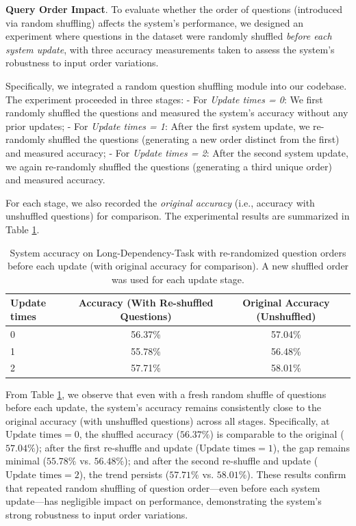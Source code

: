 \textbf{Query Order Impact}. To evaluate whether the order of questions (introduced via random shuffling) affects the system's performance, we designed an experiment where questions in the dataset were randomly shuffled \textit{before each system update}, with three accuracy measurements taken to assess the system's robustness to input order variations.

Specifically, we integrated a random question shuffling module into our codebase. The experiment proceeded in three stages: 
- For \textit{Update times = 0}: We first randomly shuffled the questions and measured the system's accuracy without any prior updates;
- For \textit{Update times = 1}: After the first system update, we re-randomly shuffled the questions (generating a new order distinct from the first) and measured accuracy;
- For \textit{Update times = 2}: After the second system update, we again re-randomly shuffled the questions (generating a third unique order) and measured accuracy.

For each stage, we also recorded the \textit{original accuracy} (i.e., accuracy with unshuffled questions) for comparison. The experimental results are summarized in Table \ref{tab:shuffling-impact}.

\begin{table}[ht]
\captionsetup{skip=10pt}
\centering
\begin{tabular}{l|c|c}
\toprule
Update times & Accuracy (With Re-shuffled Questions) & Original Accuracy (Unshuffled) \\
\midrule
0            & 56.37\%                               & 57.04\%                         \\
1            & 55.78\%                               & 56.48\%                         \\
2            & 57.71\%                               & 58.01\%                         \\
\bottomrule
\end{tabular}
\caption{System accuracy on Long-Dependency-Task with re-randomized question orders before each update (with original accuracy for comparison). A new shuffled order was used for each update stage. }
\label{tab:shuffling-impact}
\end{table}

From Table \ref{tab:shuffling-impact}, we observe that even with a fresh random shuffle of questions before each update, the system's accuracy remains consistently close to the original accuracy (with unshuffled questions) across all stages. Specifically, at \(\text{Update times} = 0\), the shuffled accuracy (\(56.37\%\)) is comparable to the original (\(57.04\%\)); after the first re-shuffle and update (\(\text{Update times} = 1\)), the gap remains minimal (\(55.78\%\) vs. \(56.48\%\)); and after the second re-shuffle and update (\(\text{Update times} = 2\)), the trend persists (\(57.71\%\) vs. \(58.01\%\)). These results confirm that repeated random shuffling of question order—even before each system update—has negligible impact on performance, demonstrating the system's strong robustness to input order variations.


